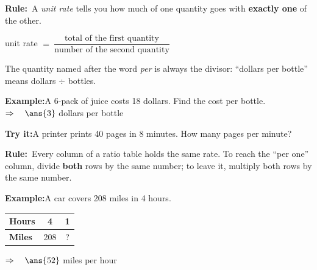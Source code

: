 \documentclass[12pt]{article}
\begin{document}


\begin{formulabox}\textbf{Rule:}\ A \emph{unit rate} tells you how much of one
quantity goes with \textbf{exactly one} of the other.\par
\centerline{unit rate $=\ \dfrac{\text{total of the first quantity}}{\text{number of the second quantity}}$}
The quantity named after the word \emph{per} is always the divisor: ``dollars
per bottle'' means dollars $\div$ bottles.
\end{formulabox}

\begin{examplebox}\textbf{Example:}\quad A 6-pack of juice costs 18 dollars.
Find the cost per bottle.
$\Rightarrow\quad \ans{3}$ dollars per bottle
\end{examplebox}

\begin{tryitbox}\textbf{Try it:}\quad A printer prints 40 pages in 8 minutes.
How many pages per minute?\\[2pt]
\end{tryitbox}


\begin{formulabox}\textbf{Rule:}\ Every column of a ratio table holds the same
rate. To reach the ``per one'' column, divide \textbf{both} rows by the same
number; to leave it, multiply both rows by the same number.
\end{formulabox}

\begin{examplebox}\textbf{Example:}\quad A car covers 208 miles in 4 hours.
\ \begin{tabular}{|l|c|c|}\hline
\textbf{Hours} & 4 & 1 \\ \hline
\textbf{Miles} & 208 & ? \\ \hline
\end{tabular}
$\Rightarrow\quad \ans{52}$ miles per hour
\end{examplebox}
\end{document}
